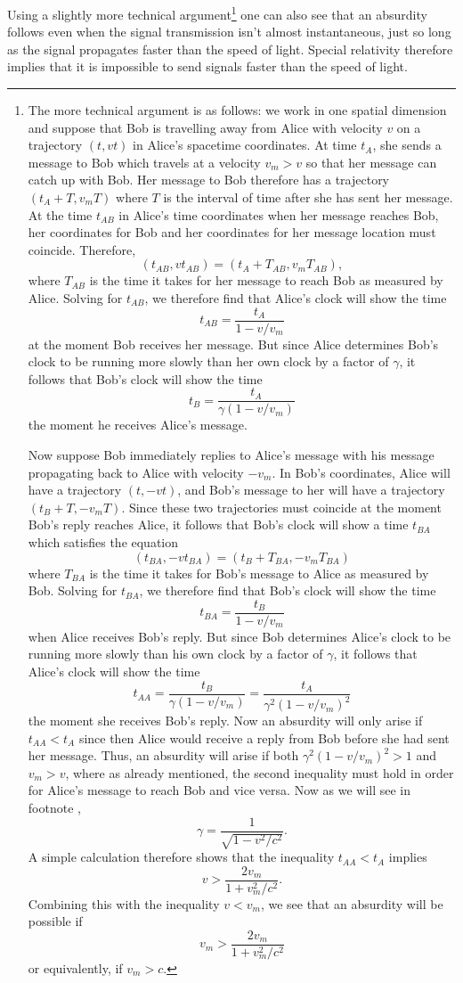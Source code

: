 \documentclass[12pt]{report}
\begin{document}
Using a slightly more technical argument\footnote{The more technical argument is as follows: we work in one spatial dimension and suppose that Bob is travelling away from Alice with velocity $v$ on a trajectory $(t, vt)$  in Alice's spacetime coordinates. At time $t_A$, she sends a message to Bob which travels at a velocity $v_m>v$ so that her message can catch up with Bob. Her message to Bob therefore has a trajectory $(t_A+T,v_m T)$ where $T$ is the interval of time after she has sent her message. At the time $t_{AB}$ in Alice's time coordinates when her message reaches Bob, her coordinates for Bob and her coordinates for her message location must coincide. Therefore, 
$$(t_{AB}, v t_{AB})=(t_A +T_{AB}, v_m T_{AB}),$$
where $T_{AB}$ is the time it takes for her message to reach Bob as measured by Alice. Solving for $t_{AB}$, we therefore find that Alice's clock will show the time $$t_{AB}=\frac{t_A}{1-v/v_m}$$ at the moment Bob receives her message. But since Alice determines Bob's clock to be running more slowly than her own clock by a factor of $\gamma$, it follows that Bob's clock will show the time  
$$t_B=\frac{t_A}{\gamma(1-v/v_m)}$$ the moment he receives Alice's message. 


Now suppose Bob immediately replies to Alice's message with his message propagating back to Alice with velocity $-v_m$. In Bob's coordinates, Alice will have a trajectory $(t,-vt)$, and Bob's message to her will have a trajectory $(t_B+T, -v_m T)$. Since these two trajectories must coincide at the moment Bob's reply reaches Alice, it follows that Bob's clock will show a time $t_{BA}$ which satisfies the equation
$$(t_{BA}, -v t_{BA})=(t_B+T_{BA}, -v_m T_{BA})$$
where $T_{BA}$ is the time it takes for Bob's message to Alice as measured by Bob. Solving for $t_{BA}$, we therefore find that Bob's clock will show the time
$$t_{BA}=\frac{t_B}{1-v/v_m}$$
when Alice receives Bob's reply. But since Bob determines Alice's clock to be running more slowly than his own clock by a factor of $\gamma$, it follows that Alice's clock will show the time  
$$t_{AA}=\frac{t_B}{\gamma(1-v/v_m)}=\frac{t_A}{\gamma^2(1-v/v_m)^2}$$ the moment she receives Bob's reply. Now an absurdity will only arise if $t_{AA}<t_A$ since then Alice would receive a reply from Bob before she had sent her message. Thus, an absurdity will arise if both $\gamma^2(1-v/v_m)^2>1$ and $v_m> v$, where as already mentioned, the second inequality must hold in order for Alice's message to reach Bob and vice versa. Now as we will see in footnote , $$\gamma=\frac{1}{\sqrt{1-v^2/c^2}}.$$ A simple calculation therefore shows that the inequality $t_{AA}<t_A$ implies
\begin{equation*}\label{absurdinequality}
v>\frac{2v_m}{1+v_m^2/c^2}.
\end{equation*}
Combining this with the inequality $v<v_m$, we see that an absurdity will be possible if 
$$ v_m>\frac{2v_m}{1+v_m^2/c^2}$$
or equivalently, if $v_m>c$.} 
one can also see that an absurdity follows even when the signal transmission isn't almost instantaneous, just so long as the signal propagates faster than the speed of light. Special relativity therefore implies that it is impossible to send signals faster than the speed of light.
\end{document}
